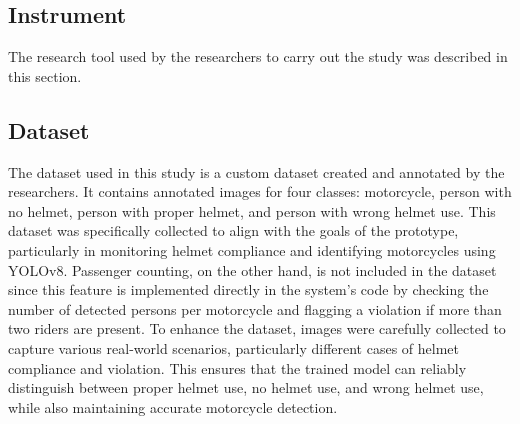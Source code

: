 \begin{refsection}
\section*{Instrument}


    The research tool used by the researchers to carry out the study was described in this section.


\subsection*{Dataset}


The dataset used in this study is a custom dataset created and annotated by the researchers. It contains annotated images for four classes: motorcycle, person with no helmet, person with proper helmet, and person with wrong helmet use. This dataset was specifically collected to align with the goals of the prototype, particularly in monitoring helmet compliance and identifying motorcycles using YOLOv8. Passenger counting, on the other hand, is not included in the dataset since this feature is implemented directly in the system’s code by checking the number of detected persons per motorcycle and flagging a violation if more than two riders are present. To enhance the dataset, images were carefully collected to capture various real-world scenarios, particularly different cases of helmet compliance and violation. This ensures that the trained model can reliably distinguish between proper helmet use, no helmet use, and wrong helmet use, while also maintaining accurate motorcycle detection.


\begin{figure}[H]
    \centering
   

\end{figure}
\end{refsection}
